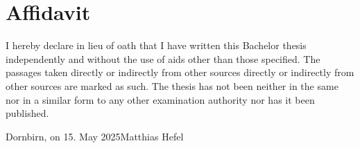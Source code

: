\documentclass[a4paper,12pt,twoside]{scrreprt}
\begin{document}
\chapter*{Affidavit}
I hereby declare in lieu of oath that I have written this Bachelor
thesis independently and without the use of aids other than those specified.
The passages taken directly or indirectly from other sources
directly or indirectly from other sources are marked as such. The thesis has
not been
neither in the same nor in a similar form to any other examination authority
nor has it been published.

\vspace{3cm}
\noindent
Dornbirn, on 15. May 2025\hfill Matthias Hefel
\end{document}
